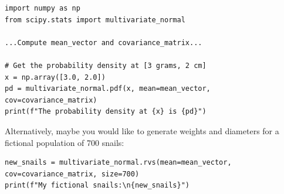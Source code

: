 \begin{verbatim}
import numpy as np
from scipy.stats import multivariate_normal

...Compute mean_vector and covariance_matrix...

# Get the probability density at [3 grams, 2 cm]
x = np.array([3.0, 2.0])
pd = multivariate_normal.pdf(x, mean=mean_vector, cov=covariance_matrix)
print(f"The probability density at {x} is {pd}")
\end{verbatim}

Alternatively, maybe you would like to generate weights and diameters for a fictional population of 700 snails:

\begin{verbatim}
new_snails = multivariate_normal.rvs(mean=mean_vector, cov=covariance_matrix, size=700)
print(f"My fictional snails:\n{new_snails}")
\end{verbatim}
